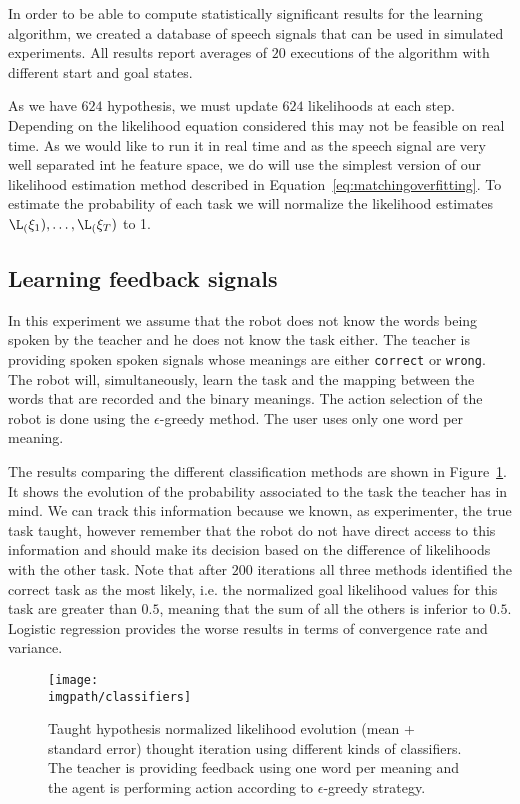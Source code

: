 In order to be able to compute statistically significant results for the learning algorithm, we created a database of speech signals that can be used in simulated experiments. All results report averages of $20$ executions of the algorithm with different start and goal states. 

As we have $624$ hypothesis, we must update $624$ likelihoods at each step. Depending on the likelihood equation considered this may not be feasible on real time. As we would like to run it in real time and as the speech signal are very well separated int he feature space, we do will use the simplest version of our likelihood estimation method described in Equation~\ref{eq:matchingoverfitting}. To estimate the probability of each task we will normalize the likelihood estimates $\L_(\xi_1),\ldots,\L_(\xi_T)$ to 1.

\subsection{Learning feedback signals}

In this experiment we assume that the robot does not know the words being spoken by the teacher and he does not know the task either. The teacher is providing spoken spoken signals whose meanings are either \texttt{correct} or \texttt{wrong}. The robot will, simultaneously, learn the task and the mapping between the words that are recorded and the binary meanings. The action selection of the robot is done using the $\epsilon$-greedy method. The user uses only one word per meaning.

The results comparing the different classification methods are shown in Figure~\ref{fig:FeedbackOneWord}. It shows the evolution of the probability associated to the task the teacher has in mind. We can track this information because we known, as experimenter, the true task taught, however remember that the robot do not have direct access to this information and should make its decision based on the difference of likelihoods with the other task. Note that after $200$ iterations all three methods identified the correct task as the most likely, i.e. the normalized goal likelihood values for this task are greater than $0.5$, meaning that the sum of all the others is inferior to $0.5$. Logistic regression provides the worse results in terms of convergence rate and variance.

\begin{figure}[!ht]
  \centering
  \texttt{[image: \\imgpath/classifiers]}
  \caption{Taught hypothesis normalized likelihood evolution (mean + standard error) thought iteration using different kinds of classifiers. The teacher is providing feedback using one word per meaning and the agent is performing action according to $\epsilon$-greedy strategy.}
  \label{fig:FeedbackOneWord}
\end{figure}

